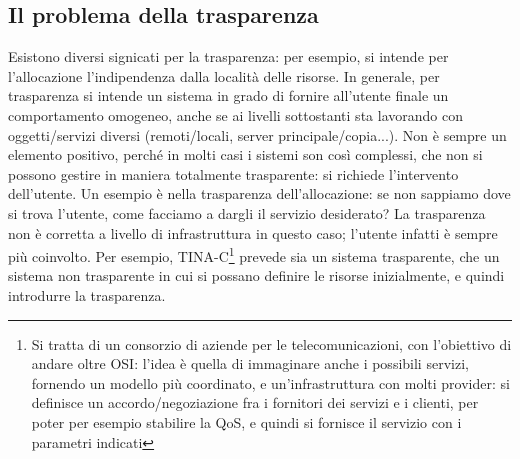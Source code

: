 \subsection{Il problema della trasparenza}
Esistono diversi signicati per la trasparenza: per esempio, si intende per l'allocazione l'indipendenza dalla località
delle risorse. In generale, per trasparenza si intende un sistema in grado di fornire all'utente finale un comportamento
omogeneo, anche se ai livelli sottostanti sta lavorando con oggetti/servizi diversi (remoti/locali, server
principale/copia...).
Non è sempre un elemento positivo, perché in molti casi i sistemi son così complessi, che non si possono gestire in
maniera totalmente trasparente: si richiede l'intervento dell'utente. Un esempio è nella trasparenza dell'allocazione:
se non sappiamo dove si trova l'utente, come facciamo a dargli il servizio desiderato? La trasparenza non è corretta 
a livello di infrastruttura in questo caso; l'utente infatti è sempre più coinvolto.
Per esempio, TINA-C\footnote{Si tratta di un consorzio di aziende per le telecomunicazioni, con l'obiettivo di andare
oltre OSI: l'idea è quella di immaginare anche i possibili servizi, fornendo un modello più coordinato, e
un'infrastruttura con molti provider: si definisce un accordo/negoziazione fra i fornitori dei servizi e i clienti, 
per poter per esempio stabilire la QoS, e quindi si fornisce il servizio con i parametri indicati} prevede sia un
sistema trasparente, che un sistema non trasparente in cui si possano definire le risorse inizialmente, e quindi
introdurre la trasparenza.
